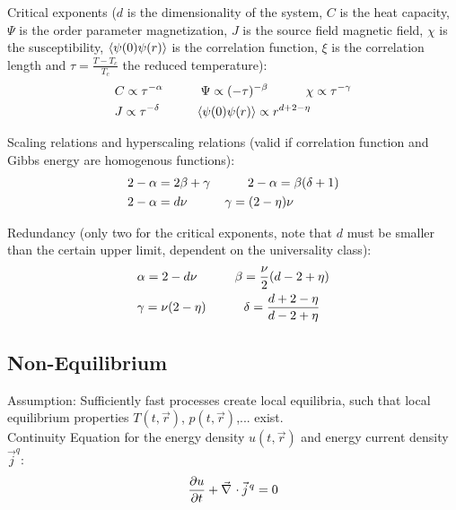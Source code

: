 			\noindent
			Critical exponents ($d$ is the dimensionality of the system, $C$ is the heat capacity, $\Psi$ is the order parameter \eg magnetization, $J$ is the source field \eg magnetic field, $\chi$ is the susceptibility, $\langle \psi(0)\psi(r) \rangle$ is the correlation function, $\xi$ is the correlation length and $\tau = \frac{T-T_c}{T_c}$ the reduced temperature):
			\begin{equation}
				\begin{aligned}
					&C \propto \tau^{-\alpha}
					\hspace{30pt} \Psi \propto (-\tau)^{-\beta}
					\hspace{30pt} \chi \propto \tau^{-\gamma} \\
					&J \propto \tau^{-\delta}
					\hspace{30pt} \langle \psi(0)\psi(r) \rangle \propto r^{d+2-\eta}
				\end{aligned}
			\end{equation}

			\noindent
			Scaling relations and hyperscaling relations (valid if correlation function and Gibbs energy are homogenous functions):
			\begin{equation}
				\begin{aligned}
					&2 - \alpha = 2\beta + \gamma
					\hspace{30pt} 2 - \alpha = \beta(\delta + 1) \\
					&2 - \alpha = d\nu
					\hspace{30pt} \gamma = (2 - \eta)\nu \\
				\end{aligned}
			\end{equation}

			\noindent
			Redundancy (only two \dof for the critical exponents, note that $d$ must be smaller than the certain upper limit, dependent on the universality class):
			\begin{equation}
				\begin{aligned}
					&\alpha = 2 - d\nu
					\hspace{30pt} \beta = \frac{\nu}{2} (d-2+\eta) \\
					& \gamma = \nu(2-\eta)
					\hspace{30pt} \delta = \frac{d+2-\eta}{d-2+\eta}
				\end{aligned}
			\end{equation}

	\subsection{Non-Equilibrium}
		\noindent
		Assumption: Sufficiently fast processes create local equilibria, such that local equilibrium properties $T(t,\vec{r})$, $p(t,\vec{r})$,... exist. \\
		Continuity Equation for the energy density $u(t,\vec{r})$ and energy current density $\vec{j}^q$:
		\begin{equation}
			\pdv{u}{t} + \Nabla\cdot\vec{j}^q = 0
		\end{equation}

